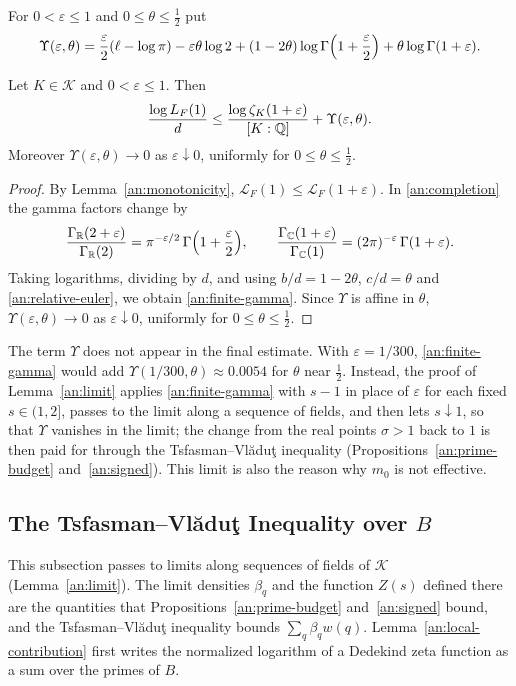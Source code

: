 For $0<\varepsilon\le1$ and $0\le\theta\le\frac12$ put
\begin{equation}\label{an:gamma}
 \Upsilon(\varepsilon,\theta)
 =\frac\varepsilon2(\ell-\log\pi)-\varepsilon\theta\log2
 +(1-2\theta)\log\Gamma\Bigl(1+\frac\varepsilon2\Bigr)
 +\theta\log\Gamma(1+\varepsilon).
\end{equation}

\begin{lemma}\label{an:shift}
Let $K\in\mathcal K$ and $0<\varepsilon\le1$. Then
\begin{equation}\label{an:finite-gamma}
 \frac{\log L_F(1)}d
 \le\frac{\log\zeta_K(1+\varepsilon)}{[K:\mathbb Q]}+\Upsilon(\varepsilon,\theta).
\end{equation}
Moreover $\Upsilon(\varepsilon,\theta)\to0$ as $\varepsilon\downarrow0$,
uniformly for $0\le\theta\le\frac12$.
\end{lemma}

\begin{proof}
By Lemma~\ref{an:monotonicity},
$\mathcal L_F(1)\le\mathcal L_F(1+\varepsilon)$. In \eqref{an:completion}
the gamma factors change by
\[
 \frac{\Gamma_\mathbb R(2+\varepsilon)}{\Gamma_\mathbb R(2)}
 =\pi^{-\varepsilon/2}\,\Gamma\Bigl(1+\frac\varepsilon2\Bigr),\qquad
 \frac{\Gamma_\mathbb C(1+\varepsilon)}{\Gamma_\mathbb C(1)}
 =(2\pi)^{-\varepsilon}\,\Gamma(1+\varepsilon).
\]
Taking logarithms, dividing by $d$, and using $b/d=1-2\theta$, $c/d=\theta$
and \eqref{an:relative-euler}, we obtain \eqref{an:finite-gamma}. Since
$\Upsilon$ is affine in $\theta$, $\Upsilon(\varepsilon,\theta)\to0$ as
$\varepsilon\downarrow0$, uniformly for $0\le\theta\le\frac12$.
\end{proof}

The term $\Upsilon$ does not appear in the final estimate. With
$\varepsilon=1/300$, \eqref{an:finite-gamma} would add
$\Upsilon(1/300,\theta)\approx0.0054$ for $\theta$ near $\frac12$. Instead,
the proof of Lemma~\ref{an:limit} applies \eqref{an:finite-gamma} with $s-1$
in place of $\varepsilon$ for each fixed $s\in(1,2]$, passes to the limit
along a sequence of fields, and then lets $s\downarrow1$, so that $\Upsilon$
vanishes in the limit; the change from the real points $\sigma>1$ back to
$1$ is then paid for through the Tsfasman--Vl\u{a}du\c{t} inequality
(Propositions~\ref{an:prime-budget} and~\ref{an:signed}). This limit is
also the reason why $m_0$ is not effective.


\subsection{\texorpdfstring{The Tsfasman--Vl\u{a}du\c{t} Inequality over $B$}{The Tsfasman-Vladut Inequality over B}}
\label{an:budget-section}
This subsection passes to limits along sequences of fields of $\mathcal K$
(Lemma~\ref{an:limit}). The limit densities $\beta_q$ and the function $Z(s)$
defined there are the quantities that Propositions~\ref{an:prime-budget}
and~\ref{an:signed} bound, and the Tsfasman--Vl\u{a}du\c{t} inequality bounds
$\sum_q\beta_qw(q)$. Lemma~\ref{an:local-contribution} first writes the
normalized logarithm of a Dedekind zeta function as a sum over the primes
of $B$.

